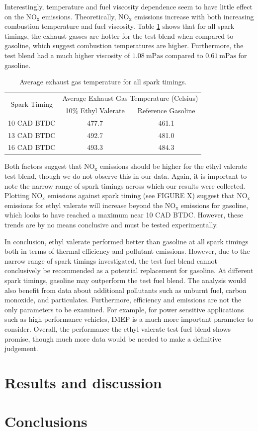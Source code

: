 \documentclass[11pt]{article}
\begin{document}
Interestingly, temperature and fuel viscosity dependence seem to have little effect on the $\text{NO}_{\text{x}}$ emissions. Theoretically, $\text{NO}_{\text{x}}$ emissions increase with both increasing combustion temperature and fuel viscosity. Table \ref{q7-t1} shows that for all spark timings, the exhaust gasses are hotter for the test blend when compared to gasoline, which suggest combustion temperatures are higher. Furthermore, the test blend had a much higher viscosity of $\SI{1.08}{\milli\pascal\second}$ compared to $\SI{0.61}{\milli\pascal\second}$ for gasoline. 
\begin{table}[H]
	\begin{center}
	\begin{tabular}{c c c}
		\toprule
		\multirow{2}{*}{Spark Timing} & \multicolumn{2}{c}{Average Exhaust Gas Temperature (Celsius)} \\
		\cmidrule{2-3} & 10\% Ethyl Valerate & Reference Gasoline \\
		\midrule
		10 CAD BTDC & 477.7 & 461.1 \\
		\midrule
		13 CAD BTDC & 492.7 & 481.0 \\
		\midrule
		16 CAD BTDC & 493.3 & 484.3 \\
		\bottomrule
	\end{tabular}
	\caption{Average exhaust gas temperature for all spark timings.}
	\label{q7-t1}
	\end{center}
\end{table}
Both factors suggest that $\text{NO}_{\text{x}}$ emissions should be higher for the ethyl valerate test blend, though we do not observe this in our data. Again, it is important to note the narrow range of spark timings across which our results were collected. Plotting $\text{NO}_{\text{x}}$ emissions against spark timing (see FIGURE X) suggest that $\text{NO}_{\text{x}}$ emissions for ethyl valerate will increase beyond the $\text{NO}_{\text{x}}$ emissions for gasoline, which looks to have reached a maximum near 10 CAD BTDC. However, these trends are by no means conclusive and must be tested experimentally.

In conclusion, ethyl valerate performed better than gasoline at all spark timings both in terms of thermal efficiency and pollutant emissions. However, due to the narrow range of spark timings investigated, the test fuel blend cannot conclusively be recommended as a potential replacement for gasoline. At different spark timings, gasoline may outperform the test fuel blend. The analysis would also benefit from data about additional pollutants such as unburnt fuel, carbon monoxide, and particulates. Furthermore, efficiency and emissions are not the only parameters to be examined. For example, for power sensitive applications such as high-performance vehicles, IMEP is a much more important parameter to consider. Overall, the performance the ethyl valerate test fuel blend shows promise, though much more data would be needed to make a definitive judgement. 
\section*{Results and discussion}
\section*{Conclusions}
\begin{thebibliography}{00}

\end{thebibliography}
\end{document}

